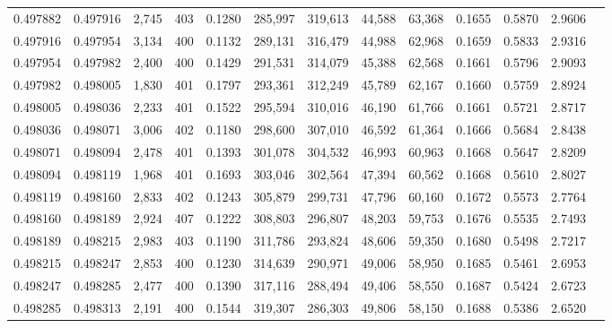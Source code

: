 \begin{tabular}{rrrrrrrrrrrrr}
0.497882 & 0.497916 & 2,745 & 403 &                                     0.1280 & 285,997 & 319,613 &  44,588 &  63,368 & 0.1655 & 0.5870 & 2.9606 \\
0.497916 & 0.497954 & 3,134 & 400 &                                     0.1132 & 289,131 & 316,479 &  44,988 &  62,968 & 0.1659 & 0.5833 & 2.9316 \\
0.497954 & 0.497982 & 2,400 & 400 &                                     0.1429 & 291,531 & 314,079 &  45,388 &  62,568 & 0.1661 & 0.5796 & 2.9093 \\
0.497982 & 0.498005 & 1,830 & 401 &                                     0.1797 & 293,361 & 312,249 &  45,789 &  62,167 & 0.1660 & 0.5759 & 2.8924 \\
0.498005 & 0.498036 & 2,233 & 401 &                                     0.1522 & 295,594 & 310,016 &  46,190 &  61,766 & 0.1661 & 0.5721 & 2.8717 \\
0.498036 & 0.498071 & 3,006 & 402 &                                     0.1180 & 298,600 & 307,010 &  46,592 &  61,364 & 0.1666 & 0.5684 & 2.8438 \\
0.498071 & 0.498094 & 2,478 & 401 &                                     0.1393 & 301,078 & 304,532 &  46,993 &  60,963 & 0.1668 & 0.5647 & 2.8209 \\
0.498094 & 0.498119 & 1,968 & 401 &                                     0.1693 & 303,046 & 302,564 &  47,394 &  60,562 & 0.1668 & 0.5610 & 2.8027 \\
0.498119 & 0.498160 & 2,833 & 402 &                                     0.1243 & 305,879 & 299,731 &  47,796 &  60,160 & 0.1672 & 0.5573 & 2.7764 \\
0.498160 & 0.498189 & 2,924 & 407 &                                     0.1222 & 308,803 & 296,807 &  48,203 &  59,753 & 0.1676 & 0.5535 & 2.7493 \\
0.498189 & 0.498215 & 2,983 & 403 &                                     0.1190 & 311,786 & 293,824 &  48,606 &  59,350 & 0.1680 & 0.5498 & 2.7217 \\
0.498215 & 0.498247 & 2,853 & 400 &                                     0.1230 & 314,639 & 290,971 &  49,006 &  58,950 & 0.1685 & 0.5461 & 2.6953 \\
0.498247 & 0.498285 & 2,477 & 400 &                                     0.1390 & 317,116 & 288,494 &  49,406 &  58,550 & 0.1687 & 0.5424 & 2.6723 \\
0.498285 & 0.498313 & 2,191 & 400 &                                     0.1544 & 319,307 & 286,303 &  49,806 &  58,150 & 0.1688 & 0.5386 & 2.6520 \\

\end{tabular}
